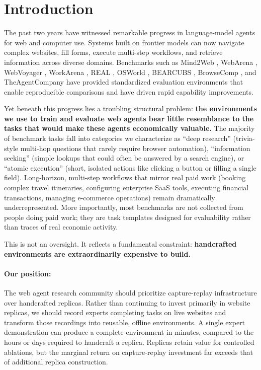 \documentclass[letterpaper]{article}
\begin{document}

\section{Introduction}
\label{sec:introduction}

The past two years have witnessed remarkable progress in language-model agents for web and computer use. Systems built on frontier models can now navigate complex websites, fill forms, execute multi-step workflows, and retrieve information across diverse domains. Benchmarks such as Mind2Web \citep{zhang2023mind2web}, WebArena \citep{zhou2023webarena}, WebVoyager \citep{he2024webvoyager}, WorkArena \citep{drouin2024workarena}, REAL \citep{garg2025real}, OSWorld \citep{xie2024osworld}, BEARCUBS \citep{song2025bearcubs}, BrowseComp \citep{wei2025browsecomp}, and TheAgentCompany \citep{xu2024theagentcompany} have provided standardized evaluation environments that enable reproducible comparisons and have driven rapid capability improvements.

Yet beneath this progress lies a troubling structural problem: \textbf{the environments we use to train and evaluate web agents bear little resemblance to the tasks that would make these agents economically valuable.} The majority of benchmark tasks fall into categories we characterize as ``deep research'' (trivia-style multi-hop questions that rarely require browser automation), ``information seeking'' (simple lookups that could often be answered by a search engine), or ``atomic execution'' (short, isolated actions like clicking a button or filling a single field). Long-horizon, multi-step workflows that mirror real paid work (booking complex travel itineraries, configuring enterprise SaaS tools, executing financial transactions, managing e-commerce operations) remain dramatically underrepresented. More importantly, most benchmarks are not collected from people doing paid work; they are task templates designed for evaluability rather than traces of real economic activity.

This is not an oversight. It reflects a fundamental constraint: \textbf{handcrafted environments are extraordinarily expensive to build.}

\paragraph{Our position:} The web agent research community should prioritize capture-replay infrastructure over handcrafted replicas. Rather than continuing to invest primarily in website replicas, we should record experts completing tasks on live websites and transform those recordings into reusable, offline environments. A single expert demonstration can produce a complete environment in minutes, compared to the hours or days required to handcraft a replica. Replicas retain value for controlled ablations, but the marginal return on capture-replay investment far exceeds that of additional replica construction.
\end{document}
